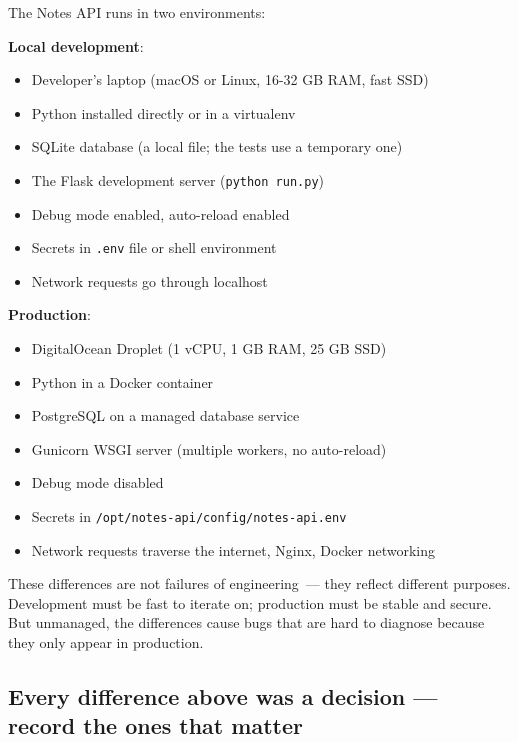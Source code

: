 The Notes API runs in two environments:

\textbf{Local development}:

\begin{itemize}
\tightlist
\item
  Developer's laptop (macOS or Linux, 16-32 GB RAM, fast SSD)
\item
  Python installed directly or in a virtualenv
\item
  SQLite database (a local file; the tests use a temporary one)
\item
  The Flask development server (\texttt{python\ run.py})
\item
  Debug mode enabled, auto-reload enabled
\item
  Secrets in \texttt{.env} file or shell environment
\item
  Network requests go through localhost
\end{itemize}

\noindent{}\textbf{Production}:

\begin{itemize}
\tightlist
\item
  DigitalOcean Droplet (1 vCPU, 1 GB RAM, 25 GB SSD)
\item
  Python in a Docker container
\item
  PostgreSQL on a managed database service
\item
  Gunicorn WSGI server (multiple workers, no auto-reload)
\item
  Debug mode disabled
\item
  Secrets in \texttt{/}\allowbreak{}\texttt{opt/}\allowbreak{}\texttt{notes-}\allowbreak{}\texttt{api/}\allowbreak{}\texttt{config/}\allowbreak{}\texttt{notes-}\allowbreak{}\texttt{api.}\allowbreak{}\texttt{env}
\item
  Network requests traverse the internet, Nginx, Docker networking
\end{itemize}

\noindent{}These differences are not failures of engineering~--- they reflect different purposes. Development must be fast to iterate on; production must be stable and secure. But unmanaged, the differences cause bugs that are hard to diagnose because they only appear in production.

\subsection*{Every difference above was a decision --- record the ones that matter}\label{39-local-vs-production:every-difference-above-was-a-decision--record-the-ones-that-matter}

